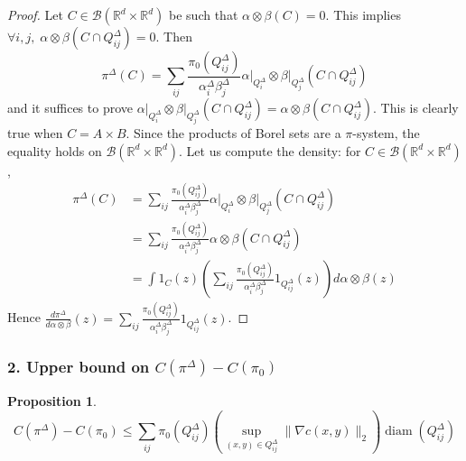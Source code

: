 \documentclass[12pt]{report}
\theoremstyle{definition}
\newtheorem{prop}[defi]{Proposition}
\theoremstyle{remark}
\DeclareMathOperator*{\diam}{diam}
\begin{document}
\begin{proof}
	Let $C\in \mathcal B(\mathbb R^d\times \mathbb R^d)$ be such that $\alpha \otimes \beta(C)=0$. This implies $\forall i,j, \;\alpha \otimes \beta(C\cap Q_{ij}^\Delta) = 0$. Then 
$$\pi^\Delta(C)= \sum_{ij} \frac{\pi_0(Q_{ij}^\Delta)}{\alpha_i^\Delta\beta_j^\Delta} \left.\alpha\right|_{Q_{i}^\Delta} \otimes \left.\beta\right|_{Q_{j}^\Delta}(C\cap Q_{ij}^\Delta)$$
and it suffices to prove  $\left.\alpha\right|_{Q_{i}^\Delta} \otimes \left.\beta\right|_{Q_{j}^\Delta}(C\cap Q_{ij}^\Delta) = \alpha \otimes \beta(C\cap Q_{ij}^\Delta)$. This is clearly true when $C=A\times B$. Since the products of Borel sets are a $\pi$-system, the equality holds on $\mathcal B(\mathbb R^d\times \mathbb R^d)$. Let us compute the density: for $C\in \mathcal B(\mathbb R^d\times \mathbb R^d)$, 
$$\begin{aligned}
	\pi^\Delta(C) 
	&= \sum_{ij} \frac{\pi_0(Q_{ij}^\Delta)}{\alpha_i^\Delta\beta_j^\Delta} \left.\alpha\right|_{Q_{i}^\Delta} \otimes \left.\beta\right|_{Q_{j}^\Delta}(C\cap Q_{ij}^\Delta) \\
	&= \sum_{ij} \frac{\pi_0(Q_{ij}^\Delta)}{\alpha_i^\Delta\beta_j^\Delta} \alpha \otimes\beta(C\cap Q_{ij}^\Delta) \\
	&= \int 1_C(z) \left(\sum_{ij} \frac{\pi_0(Q_{ij}^\Delta)}{\alpha_i^\Delta\beta_j^\Delta} 1_{Q_{ij}^\Delta}(z)\right) d\alpha \otimes\beta(z)
\end{aligned}$$
Hence $\displaystyle \frac{d\pi^\Delta}{d\alpha \otimes\beta}(z)=  \sum_{ij} \frac{\pi_0(Q_{ij}^\Delta)}{\alpha_i^\Delta\beta_j^\Delta} 1_{Q_{ij}^\Delta}(z)$.
\end{proof}



\subsubsection*{2. Upper bound on $C(\pi^{\Delta})-C(\pi_{0})$}

\begin{prop}\label{prop1}
	$$C(\pi^{\Delta})-C(\pi_{0})\leq \sum_{ij} \pi_0(Q_{ij}^{\Delta}) \left(\sup_{(x,y)\in Q_{ij}^\Delta} \|\nabla c(x,y)\|_2\right)\diam(Q_{ij}^{\Delta})$$
\end{prop}
\end{document}
